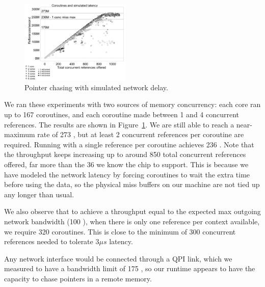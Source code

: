 \documentclass[10pt,nocopyrightspace,preprint]{sigplanconf}
\begin{document}
\begin{figure}[h]
  \begin{center}
    \includegraphics[width=0.47\textwidth]{figures/multi-green-delay7800-edited.pdf}
  \end{center}
  \caption{Pointer chasing with simulated network delay.}
  \label{fig:network-delay}
\end{figure}

We ran these experiments with two sources of memory concurrency: each
core ran up to 167 coroutines, and each coroutine made between 1 and 4
concurrent references. The results are shown in
Figure~\ref{fig:network-delay}. We are still able to reach a
near-maximum rate of 273 \mrps, but at least 2
concurrent references per coroutine are required. Running with a single
reference per coroutine achieves 236 \mrps. Note that the throughput keeps increasing up to around 850 total concurrent references offered, far more than the 36 we know the chip to support. This is because we have modeled the network latency by forcing coroutines to wait the extra time before using the data, so the physical miss buffers on our machine are not tied up any longer than usual.

We also observe that to achieve a throughput equal to the expected max outgoing network bandwidth (100 \mrps),  when there is only one reference per context available, we require 320 coroutines. This is close to the minimum of 300 concurrent references needed to tolerate $3 \mu s$ latency.

Any network interface would be connected through a QPI link,
which we measured to have a bandwidth limit of 175 \mrps, so our runtime appears to have the capacity to chase pointers
in a remote memory. 



%
\end{document}

